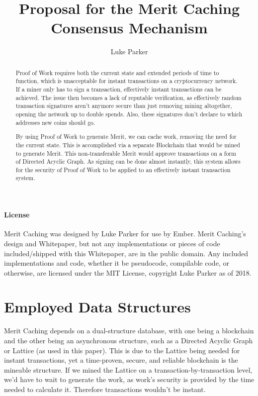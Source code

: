 \documentclass[14pt]{article}
\title{Proposal for the Merit Caching Consensus Mechanism}
\author{Luke Parker}
\begin{document}
\maketitle

\label{sec:abstract}
\begin{abstract}
Proof of Work requires both the current state and extended periods of time to function, which is unacceptable for instant transactions on a cryptocurrency network. If a miner only has to sign a transaction, effectively instant transactions can be achieved. The issue then becomes a lack of reputable verification, as effectively random transaction signatures aren't anymore secure than just removing mining altogether, opening the network up to double spends. Also, these signatures don't declare to which addresses new coins should go.

By using Proof of Work to generate Merit, we can cache work, removing the need for the current state. This is accomplished via a separate Blockchain that would be mined to generate Merit. This non-transferable Merit would approve transactions on a form of Directed Acyclic Graph. As signing can be done almost instantly, this system allows for the security of Proof of Work to be applied to an effectively instant transaction system.
\end{abstract}

\label{sec:license}
\paragraph{License}
Merit Caching was designed by Luke Parker for use by Ember. Merit Caching's design and Whitepaper, but not any implementations or pieces of code included/shipped with this Whitepaper, are in the public domain. Any included implementations and code, whether it be pseudocode, compilable code, or otherwise, are licensed under the MIT License, copyright Luke Parker as of 2018.

\newpage

\label{sec:toc}
\setcounter{tocdepth}{3}
\tableofcontents

\newpage

\label{sec:1}
\section{Employed Data Structures}
Merit Caching depends on a dual-structure database, with one being a blockchain and the other being an asynchronous structure, such as a Directed Acyclic Graph or Lattice (as used in this paper). This is due to the Lattice being needed for instant transactions, yet a time-proven, secure, and reliable blockchain is the mineable structure. If we mined the Lattice on a transaction-by-transaction level, we'd have to wait to generate the work, as work's security is provided by the time needed to calculate it. Therefore transactions wouldn't be instant.
\end{document}

